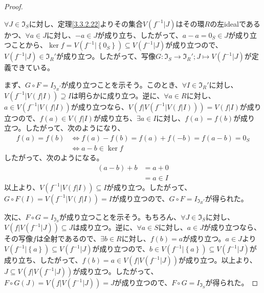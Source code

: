 \documentclass[dvipdfmx]{jsarticle}
\begin{document}
\begin{proof}
\begin{center}
\end{center}
$\forall J \in \mathfrak{I}_{S}$に対し、定理\ref{3.3.2.22}よりその集合$V\left( f^{- 1}|J \right)$はその環$R$の左idealであるかつ、$\forall a \in J$に対し、$- a \in J$が成り立ち、したがって、$a - a = 0_{S} \in J$が成り立つことから、$\ker f = V\left( f^{- 1}|\left\{ 0_{S} \right\} \right) \subseteq V\left( f^{- 1}|J \right)$が成り立つので、$V\left( f^{- 1}|J \right) \in \mathfrak{I}_{R}'$が成り立つ。したがって、写像$G:\mathfrak{I}_{S} \rightarrow \mathfrak{I}_{R}';J \mapsto V\left( f^{- 1}|J \right)$が定義できている。\par
まず、$G \circ F = I_{\mathfrak{I}_{R}'}$が成り立つことを示そう。このとき、$\forall I \in \mathfrak{I}_{R}'$に対し、$V\left( f^{- 1}|V\left( f|I \right) \right) \supseteq I$は明らかに成り立つ。逆に、$\forall a \in R$に対し、$a \in V\left( f^{- 1}|V\left( f|I \right) \right)$が成り立つなら、$V\left( f|V\left( f^{- 1}|V\left( f|I \right) \right) \right) = V\left( f|I \right)$が成り立つので、$f(a) \in V\left( f|I \right)$が成り立ち、$\exists a \in I$に対し、$f(a) = f(b)$が成り立つ。したがって、次のようになり、
\begin{align*}
f(a) = f(b) &\Leftrightarrow f(a) - f(b) = f(a) + f( - b) = f(a - b) = 0_{S}\\
&\Leftrightarrow a - b \in \ker f
\end{align*}
したがって、次のようになる。
\begin{align*}
(a - b) + b &= a + 0\\
&= a \in I
\end{align*}
以上より、$V\left( f^{- 1}|V\left( f|I \right) \right) \subseteq I$が成り立つ。したがって、$G \circ F(I) = V\left( f^{- 1}|V\left( f|I \right) \right) = I$が成り立つので、$G \circ F = I_{\mathfrak{I}_{R}'}$が得られた。\par
次に、$F \circ G = I_{\mathfrak{I}_{S}}$が成り立つことを示そう。もちろん、$\forall J \in \mathfrak{I}_{S}$に対し、$V\left( f|V\left( f^{- 1}|J \right) \right) \subseteq J$は成り立つ。逆に、$\forall a \in S$に対し、$a \in J$が成り立つなら、その写像$f$は全射であるので、$\exists b \in R$に対し、$f(b) = a$が成り立つ。$a \in J$より$V\left( f^{- 1}|\left\{ a \right\} \right) \subseteq V\left( f^{- 1}|J \right)$が成り立つので、$b \in V\left( f^{- 1}|\left\{ a \right\} \right) \subseteq V\left( f^{- 1}|J \right)$が成り立ち、したがって、$f(b) = a \in V\left( f|V\left( f^{- 1}|J \right) \right)$が成り立つ。以上より、$J \subseteq V\left( f|V\left( f^{- 1}|J \right) \right)$が成り立つ。したがって、$F \circ G(J) = V\left( f|V\left( f^{- 1}|J \right) \right) = J$が成り立つので、$F \circ G = I_{\mathfrak{I}_{S}}$が得られた。\par

\end{proof}
\end{document}
